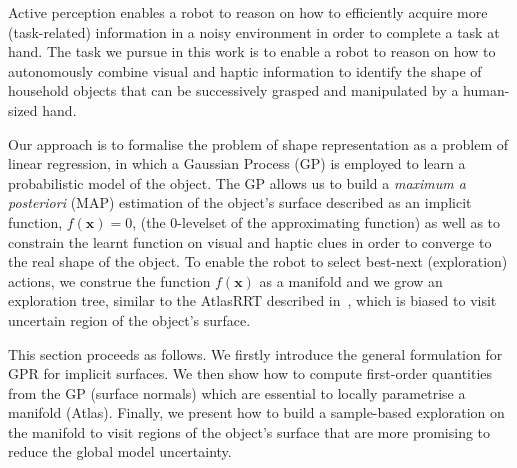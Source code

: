 
Active perception enables a robot to reason on how to efficiently acquire more (task-related) information in a noisy environment in order to complete a task at hand.
The task we pursue in this work is to enable a robot to reason on how to autonomously combine visual and haptic information to identify the shape of household objects that can be successively grasped and manipulated by a human-sized hand. 

Our approach is to formalise the problem of shape representation as a problem of linear regression, in which a Gaussian Process (GP) is employed to learn a probabilistic model of the object. The GP allows us to build a \emph{maximum a posteriori} (MAP) estimation of the object's surface described as an implicit function, $f(\mathbf{x})=0$, (the 0-levelset of the approximating function) as well as to constrain the learnt function on visual and haptic clues in order to converge to the real shape of the object. To enable the robot to select best-next (exploration) actions, we construe the function $f(\mathbf{x})$ as a manifold and we grow an exploration tree, similar to the AtlasRRT described in~\cite{Jaillet2013Path}, which is biased to visit uncertain region of the object's surface.

This section proceeds as follows. We firstly introduce the general formulation for GPR for implicit surfaces. We then show how to compute first-order quantities from the GP (surface normals) which are essential to locally parametrise a manifold (Atlas). Finally, we present how to build a sample-based exploration on the manifold to visit regions of the object's surface that are more promising to reduce the global model uncertainty.


